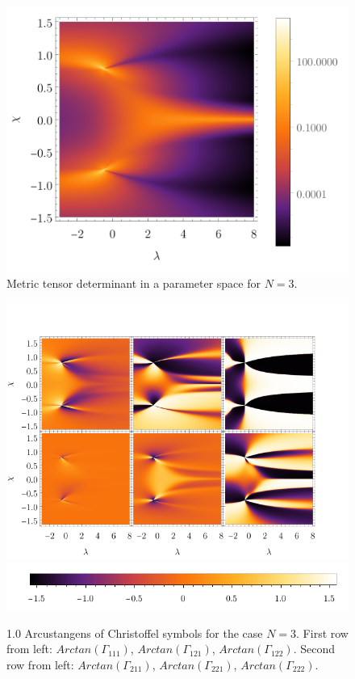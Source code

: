 \begin{figure}[H]
    \centering
    \includegraphics[scale=1.3]{../img/N=3_gDivergence.pdf}
    \caption{Metric tensor determinant in a parameter space for $N=3$.}
    \label{fig:N=3_gDivenrgence}    
\end{figure}

\vspace{-40pt}
\begin{figure}[H]
    \centering
    \includegraphics[scale=1.3]{../img/N=3_gammas.pdf}    
    \includegraphics[scale=1.3]{../img/N=3_barA.pdf}
    \caption{1.0 Arcustangens of Christoffel symbols for the case $N=3$. First row from left: $Arctan(\Gamma_{111})$, $Arctan(\Gamma_{121})$, $Arctan(\Gamma_{122})$. Second row from left: $Arctan(\Gamma_{211})$, $Arctan(\Gamma_{221})$, $Arctan(\Gamma_{222})$.}
    \label{fig:N=3_G}
\end{figure}

